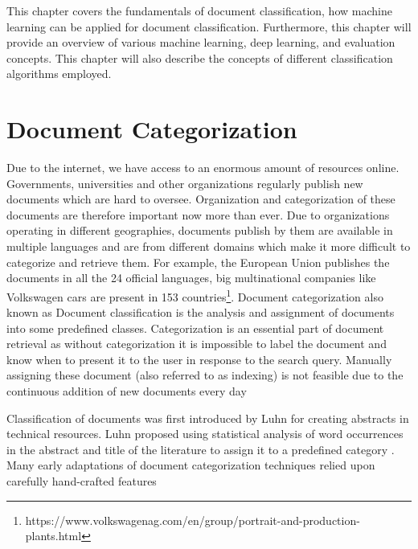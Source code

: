 \label{ch:background}

This chapter covers the fundamentals of document classification, how machine learning can be applied for document classification. Furthermore, this chapter will provide an overview of various machine learning, deep learning, and evaluation concepts.  This chapter will also describe the concepts of different classification algorithms employed. 

\section{Document Categorization}
Due to the internet, we have access to an enormous amount of resources online. Governments, universities and other organizations regularly publish new documents which are hard to oversee. Organization and categorization of these documents are therefore important now more than ever. Due to organizations operating in different geographies, documents publish by them are available in multiple languages and are from different domains which make it more difficult to categorize and retrieve them. For example, the European Union publishes the documents in all the 24 official languages, big multinational companies like Volkswagen cars are present in 153 countries\footnote{https://www.volkswagenag.com/en/group/portrait-and-production-plants.html}. Document categorization also known as Document classification is the analysis and assignment of documents into some predefined classes. Categorization is an essential part of document retrieval as without categorization it is impossible to label the document and know when to present it to the user in response to the search query. Manually assigning these document (also referred to as indexing) is not feasible due to the continuous addition of new documents every day

Classification of documents was first introduced by Luhn for creating abstracts in technical resources. Luhn proposed using statistical analysis of word occurrences in the abstract and title of the literature to assign it to a predefined category \cite{luhn1958automatic}. Many early adaptations of document categorization techniques relied upon carefully hand-crafted features \cite{Hayes:1990:CSC:645450.653070, Biebricher:1988:AIS:62437.62470}

